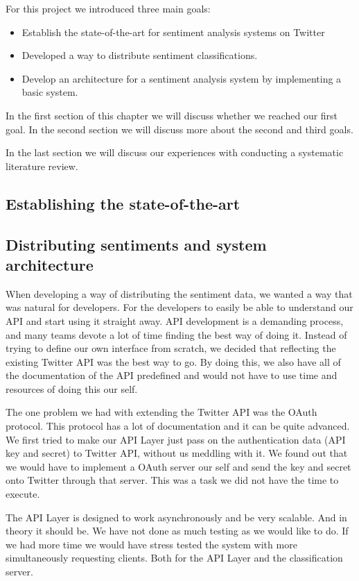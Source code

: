 
For this project we introduced three main goals:
\begin{itemize}
\item Establish the state-of-the-art for sentiment analysis systems on Twitter
\item Developed a way to distribute sentiment classifications.
\item Develop an architecture for a sentiment analysis system by implementing a basic system.
\end{itemize}

In the first section of this chapter we will discuss whether we reached our first goal. In the second section we will discuss more about the second and third goals. 

In the last section we will discuss our experiences with conducting a systematic literature review. 


\subsection{Establishing the state-of-the-art}

\subsection{Distributing sentiments and system architecture}

When developing a way of distributing the sentiment data, we wanted a way that was natural for developers. For the developers to easily be able to understand our API and start using it straight away. API development is a demanding process, and many teams devote a lot of time finding the best way of doing it. Instead of trying to define our own interface from scratch, we decided that reflecting the existing Twitter API was the best way to go. By doing this, we also have all of the documentation of the API predefined and would not have to use time and resources of doing this our self. 

The one problem we had with extending the Twitter API was the OAuth protocol. This protocol has a lot of documentation and it can be quite advanced. We first tried to make our API Layer just pass on the authentication data (API key and secret) to Twitter API, without us meddling with it. We found out that we would have to implement a OAuth server our self and send the key and secret onto Twitter through that server. This was a task we did not have the time to execute. 

The API Layer is designed to work asynchronously and be very scalable. And in theory it should be. We have not done as much testing as we would like to do. If we had more time we would have stress tested the system with more simultaneously requesting clients. Both for the API Layer and the classification server. 

